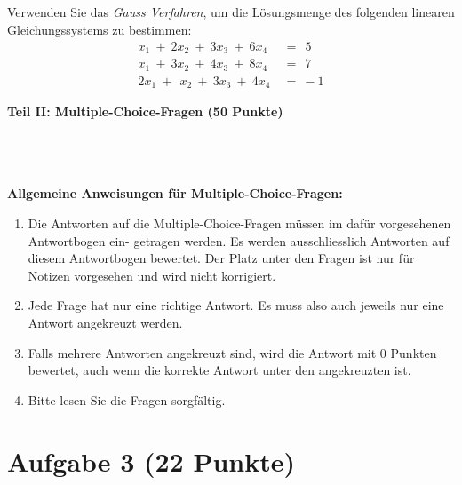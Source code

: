 \subsection*{}
Verwenden Sie das \textit{Gauss Verfahren}, um die Lösungsmenge des folgenden linearen Gleichungssystems zu bestimmen:
\begin{equation*}
\begin{split}
x_1 \ + \ 2 x_2 \ + \ 3 x_3 \ + \ 6 x_4 \ &= \ \ 5 \\
x_1 \ + \ 3 x_2 \ + \ 4 x_3 \ + \ 8 x_4 \ &= \ \ 7 \\
2 x_1 \ + \ \ x_2 \ + \ 3 x_3 \ + \ 4 x_4 \ &= \ -1
\end{split}
\end{equation*}
\newpage


\begin{Large}
\textbf{Teil II: Multiple-Choice-Fragen (50 Punkte)}
\end{Large}
\\
\\
\\
\textbf{Allgemeine Anweisungen für Multiple-Choice-Fragen:}
\\
\renewcommand{\labelenumi}{(\roman{enumi})}
\begin{enumerate}
\item
Die Antworten auf die Multiple-Choice-Fragen müssen im dafür vorgesehenen Antwortbogen ein-
getragen werden. Es werden ausschliesslich Antworten auf diesem Antwortbogen bewertet. Der
Platz unter den Fragen ist nur für Notizen vorgesehen und wird nicht korrigiert.

\item
Jede Frage hat nur eine richtige Antwort. Es muss also auch jeweils nur eine Antwort angekreuzt
werden.

\item
Falls mehrere Antworten angekreuzt sind, wird die Antwort mit 0 Punkten bewertet, auch wenn
die korrekte Antwort unter den angekreuzten ist.

\item
Bitte lesen Sie die Fragen sorgfältig.

\end{enumerate}
\newpage
\section*{Aufgabe 3 (22 Punkte)}
\vspace{0.4cm}
